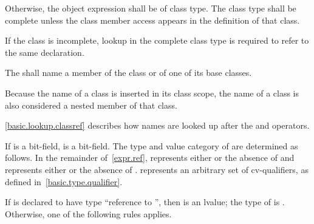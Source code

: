 \pnum
Otherwise, the object expression shall be of class type.
The class type shall be complete
unless the class member access appears in the definition of that class.
\begin{note}
If the class is incomplete,
lookup in the complete class type is required to refer
to the same declaration.
\end{note}
The  shall name a member of the class or of one of
its base classes.
\begin{note}
Because the name of a class is inserted in its class scope,
the name of a class is also considered a nested
member of that class.
\end{note}
\begin{note}
\ref{basic.lookup.classref} describes how names are looked up after the
 and \tcode{->} operators.
\end{note}

\pnum
If  is a bit-field,  is a bit-field. The
type and value category of  are determined as follows.
In the remainder of~\ref{expr.ref},  represents either
 or the absence of  and  represents
either  or the absence of . 
represents an arbitrary set of cv-qualifiers, as defined
in~\ref{basic.type.qualifier}.

\pnum
If  is declared to have type ``reference to '', then
 is an lvalue; the type of  is .
Otherwise, one of the following rules applies.

